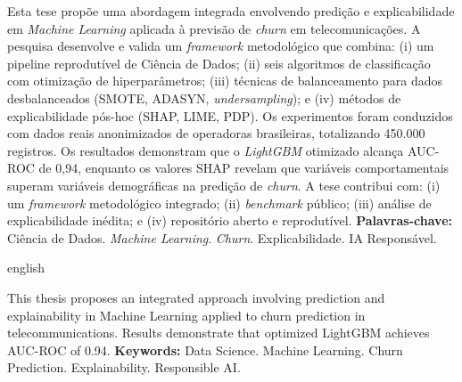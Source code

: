 \documentclass[
    12pt,
    oneside,
    a4paper,
    english,
    brazilian
    ]{abntex2}
\numberwithin{equation}{chapter}
\begin{document}
\pretextual
\maketitle
\newpage

\begin{resumo}
\noindent Esta tese propõe uma abordagem integrada envolvendo predição e explicabilidade em \textit{Machine Learning} aplicada à previsão de \textit{churn} em telecomunicações. A pesquisa desenvolve e valida um \textit{framework} metodológico que combina: (i) um pipeline reprodutível de Ciência de Dados; (ii) seis algoritmos de classificação com otimização de hiperparâmetros; (iii) técnicas de balanceamento para dados desbalanceados (SMOTE, ADASYN, \textit{undersampling}); e (iv) métodos de explicabilidade pós-hoc (SHAP, LIME, PDP). Os experimentos foram conduzidos com dados reais anonimizados de operadoras brasileiras, totalizando 450.000 registros. Os resultados demonstram que o \textit{LightGBM} otimizado alcança AUC-ROC de 0,94, enquanto os valores SHAP revelam que variáveis comportamentais superam variáveis demográficas na predição de \textit{churn}. A tese contribui com: (i) um \textit{framework} metodológico integrado; (ii) \textit{benchmark} público; (iii) análise de explicabilidade inédita; e (iv) repositório aberto e reprodutível. 
\noindent \textbf{Palavras-chave:} Ciência de Dados. \textit{Machine Learning}. \textit{Churn}. Explicabilidade. IA Responsável.
\end{resumo}

\begin{otherlanguage*}{english}
\begin{resumo}[Abstract]
\noindent This thesis proposes an integrated approach involving prediction and explainability in Machine Learning applied to churn prediction in telecommunications. Results demonstrate that optimized LightGBM achieves AUC-ROC of 0.94. 
\noindent \textbf{Keywords:} Data Science. Machine Learning. Churn Prediction. Explainability. Responsible AI.
\end{resumo}
\end{otherlanguage*}
\newpage

\listoffigures*
\newpage
{}
\listoftables*
\newpage

\textual
\end{document}

